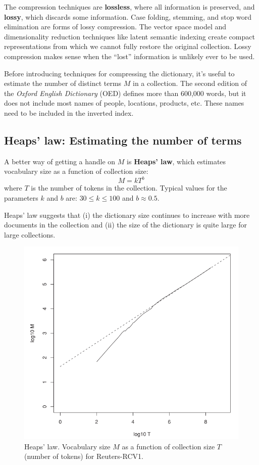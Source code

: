 \documentclass[letterpaper,11pt]{article}
\begin{document}
The compression techniques are \textbf{lossless}, where all information is preserved, and \textbf{lossy}, which discards some information. Case folding, stemming, and stop word elimination are forms of lossy compression. The vector space model and dimensionality reduction techniques like latent semantic indexing create compact representations from which we cannot fully restore the original collection. Lossy compression makes sense when the “lost” information is unlikely ever to be used.

Before introducing techniques for compressing the dictionary, it's useful to estimate the number of distinct terms $M$ in a collection. The second edition of the \textit{Oxford English Dictionary} (OED) defines more than 600,000 words, but it does not include most names of people, locations, products, etc. These names need to be included in the inverted index.

\subsection{Heaps’ law: Estimating the number of terms}
A better way of getting a handle on $M$ is \textbf{Heaps’ law}, which estimates vocabulary size as a function of collection size:
\[
M=kT^b
\]
where $T$ is the number of tokens in the collection. Typical values for the parameters $k$ and $b$ are: $30 \leq k \leq 100$ and $b \approx 0.5$.

Heaps’ law suggests that (i) the dictionary size continues to increase with more documents in the collection and (ii) the size of the dictionary is quite large for large collections.

\begin{figure}[H]
    \centering
    \includegraphics[scale=0.60]{sect5/figure_5_1.png}
    \caption{Heaps’ law. Vocabulary size $M$ as a function of collection size $T$ (number of tokens) for Reuters-RCV1.}
\end{figure}
\end{document}
